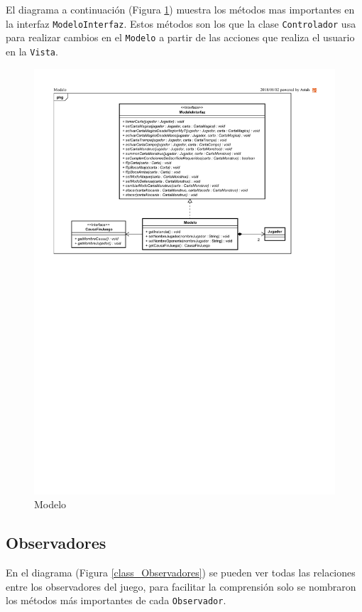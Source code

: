 	El diagrama a continuación (Figura \ref{class_Modelo}) muestra los métodos mas importantes en la interfaz \texttt{ModeloInterfaz}. Estos métodos son los que la clase \texttt{Controlador} usa para realizar cambios en el \texttt{Modelo} a partir de las acciones que realiza el usuario en la \texttt{Vista}.
	
	\begin{figure}[H]
		\centering
		\includegraphics[scale=0.8]{includes/class_Modelo}
		\caption{Modelo}
		\label{class_Modelo}
	\end{figure}
	
	\subsection{Observadores}
	
	En el diagrama (Figura \ref{class_Observadores}) se pueden ver todas las relaciones entre los observadores del juego, para facilitar la comprensión solo se nombraron los métodos más importantes de cada \texttt{Observador}.
	

